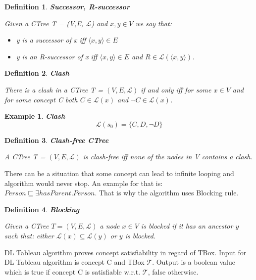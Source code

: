 \documentclass[12pt,a4paper]{article}
\newtheorem{definition}{Definition}[subsection]
\newtheorem{example}{Example}[subsection]
\begin{document}
\begin{definition}{\textbf{Successor, R-successor}}

	Given a CTree T = (V,E, $\mathcal{L}$) and $x,y \in V$ we say that: 
	\begin{itemize}
		\item y is a successor of x iff $\langle x,y \rangle \in E$
		\item y is an R-successor of x iff $\langle x,y \rangle \in E$ and $R \in \mathcal{L}(\langle x,y \rangle)$.
	\end{itemize}
\end{definition}

\begin{definition}{\textbf{Clash}}

	There is a clash in a CTree T = $(V,E, \mathcal{L})$ if and only iff for some $x \in V$ and for some concept C both $C \in \mathcal{L}(x)$ and $\neg C \in \mathcal{L}(x)$.
\end{definition}

\begin{example}{\textbf{Clash}}
	\[ \mathcal{L}(s_{0}) = \{ C, D, \neg D \} \]
\end{example}

\begin{definition}{\textbf{Clash-free CTree}}

A CTree T = $(V,E, \mathcal{L})$ is clash-free iff none of the nodes in V contains a clash.
\end{definition}

There can be a situation that some concept can lead to infinite looping and algorithm would never stop. An example for that is: $Person \sqsubseteq \exists hasParent.Person$. That is why the algorithm uses Blocking rule.

\begin{definition}{\textbf{Blocking}}
	
	Given a CTree $T = (V, E, \mathcal{L})$ a node $x \in V$ is blocked if it has an ancestor $y$ such that: either $\mathcal{L}(x) \subseteq \mathcal{L}(y)$ or $y$ is blocked.
\end{definition}

DL Tableau algorithm proves concept satisfiability in regard of TBox. Input for DL Tableau algorithm is concept C and TBox $\mathcal{T}$. Output is a boolean value which is true if concept C is satisfiable w.r.t. $\mathcal{T}$, false otherwise.
\end{document}

